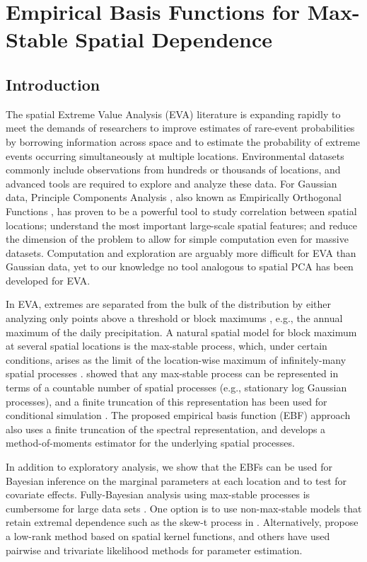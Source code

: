 \chapter{Empirical Basis Functions for Max-Stable Spatial Dependence} \label{chap:four}

\section{Introduction}\label{ebs:intro}
The spatial Extreme Value Analysis (EVA) literature is expanding rapidly \citep{Davison2012} to meet the demands of researchers to improve estimates of rare-event probabilities by borrowing information across space and to estimate the probability of extreme events occurring simultaneously at multiple locations.
Environmental datasets commonly include observations from hundreds or thousands of locations, and advanced tools are required to explore and analyze these data.
For Gaussian data, Principle Components Analysis \citep[PCA]{Everitt2008}, also known as Empirically Orthogonal Functions \citep[EOF]{Toggweiler2001}, has proven to be a powerful tool to study correlation between spatial locations; understand the most important large-scale spatial features; and reduce the dimension of the problem to allow for simple computation even for massive datasets.
Computation and exploration are arguably more difficult for EVA than Gaussian data, yet to our knowledge no tool analogous to spatial PCA has been developed for EVA.

In EVA, extremes are separated from the bulk of the distribution by either analyzing only points above a threshold or block maximums \citep{Coles2001}, e.g., the annual maximum of the daily precipitation.
A natural spatial model for block maximum at several spatial locations is the max-stable process, which, under certain conditions, arises as the limit of the location-wise maximum of infinitely-many spatial processes \citep{deHaan2006}.
 showed that any max-stable process can be represented in terms of a countable number of spatial processes (e.g., stationary log Gaussian processes), and a finite truncation of this representation has been used for conditional simulation \citep{Wang2011}.
The proposed empirical basis function (EBF) approach also uses a finite truncation of the spectral representation, and develops a method-of-moments estimator for the underlying spatial processes.

In addition to exploratory analysis, we show that the EBFs can be used for Bayesian inference on the marginal parameters at each location and to test for covariate effects.
Fully-Bayesian analysis using max-stable processes is cumbersome for large data sets \citep{Wadsworth2014,Thibaud2013a}.
One option is to use non-max-stable models that retain extremal dependence such as the skew-t process in \citep{Morris2016}.
Alternatively, \citet{Reich2012} propose a low-rank method based on spatial kernel functions, and others have used pairwise \citep{Padoan2010,Huser2014} and trivariate \citep{Genton2011} likelihood methods for parameter estimation.


